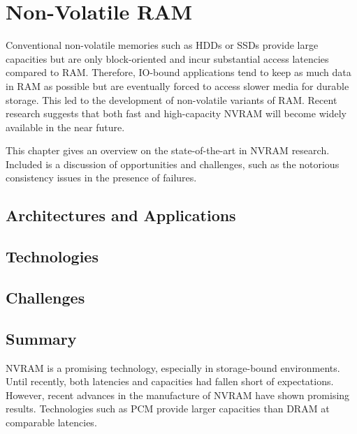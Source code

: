 \chapter{Non-Volatile RAM}
\label{ch:nvram}

Conventional non-volatile memories such as \acp{HDD} or \acp{SSD} provide large
capacities but are only block-oriented and incur substantial access latencies
compared to \ac{RAM}. Therefore, \ac{IO}-bound applications tend to keep as much
data in \ac{RAM} as possible but are eventually forced to access slower media
for durable storage. This led to the development of non-volatile variants of
\ac{RAM}. Recent research suggests that both fast and high-capacity \ac{NVRAM}
will become widely available in the near future.

This chapter gives an overview on the state-of-the-art in \ac{NVRAM} research.
Included is a discussion of opportunities and challenges, such as the notorious
consistency issues in the presence of failures.

\section{Architectures and Applications}
\label{ch:nvram-architectures}


\section{Technologies}
\label{ch:nvram-technologies}


\section{Challenges}
\label{ch:nvram-challenges}


% 

\section{Summary}
\label{ch:nvram-summary}

\ac{NVRAM} is a promising technology, especially in storage-bound environments.
Until recently, both latencies and capacities had fallen short of expectations.
However, recent advances in the manufacture of \ac{NVRAM} have shown promising
results. Technologies such as \ac{PCM} provide larger capacities than \ac{DRAM}
at comparable latencies.

